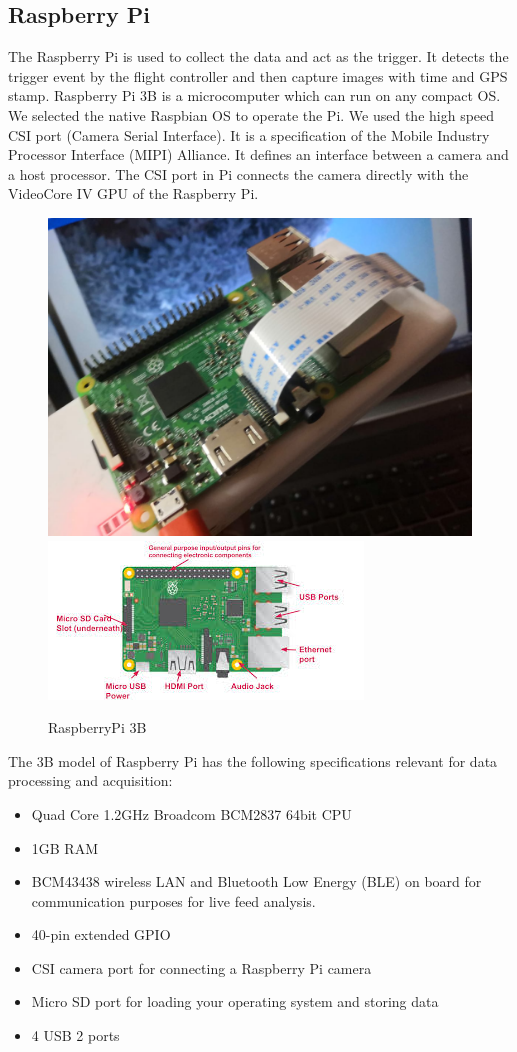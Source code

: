 \subsection{Raspberry Pi}
 The Raspberry Pi is used to collect the data and act as the trigger. It detects the trigger event by the flight controller and then capture images with time and GPS stamp. Raspberry Pi 3B is a microcomputer which can run on any compact OS. We selected the native Raspbian OS to operate the Pi. We used the high speed CSI port (Camera Serial Interface). It is a specification of the Mobile Industry Processor Interface (MIPI) Alliance. It defines an interface between a camera and a host processor. The CSI port in Pi connects the camera directly with the VideoCore IV GPU of the Raspberry Pi.
 \begin{figure}[H]
    \centering
    \includegraphics[width=0.5\linewidth]{SummerInterReport/project/Images-Major/pi_top.jpeg}
    \includegraphics[width=0.5\linewidth]{SummerInterReport/project/Images-Major/pi.jpg}
    \caption{RaspberryPi 3B}
    \label{fig:compEy}
\end{figure}
 The 3B model of Raspberry Pi has the following specifications relevant for data processing and acquisition:
 \begin{itemize}
     \item Quad Core 1.2GHz Broadcom BCM2837 64bit CPU
     \item 1GB RAM
     \item BCM43438 wireless LAN and Bluetooth Low Energy (BLE) on board for communication purposes for live feed analysis.
     \item 40-pin extended GPIO
     \item CSI camera port for connecting a Raspberry Pi camera
     \item Micro SD port for loading your operating system and storing data
     \item 4 USB 2 ports
 \end{itemize}
